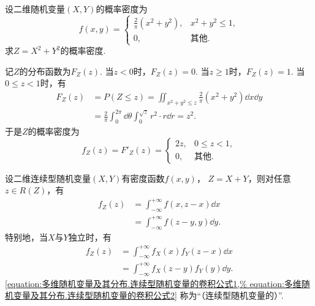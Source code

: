 \begin{example}
设二维随机变量\((X,Y)\)的概率密度为\begin{equation*}
	f(x,y) = \left\{ \begin{array}{cl}
		\frac2\pi (x^2+y^2), & x^2+y^2\leq1, \\
		0, & \text{其他}.
	\end{array} \right.
\end{equation*}
求\(Z = X^2 + Y^2\)的概率密度.
\begin{solution}
记\(Z\)的分布函数为\(F_Z(z)\).
当\(z < 0\)时，\(F_Z(z) = 0\).
当\(z \geq 1\)时，\(F_Z(z) = 1\).
当\(0 \leq z < 1\)时，有\begin{align*}
	F_Z(z) &= P(Z \leq z)
	= \iint_{x^2+y^2 \leq z} \frac2\pi (x^2+y^2) \dd{x}\dd{y} \\
	&= \frac2\pi \int_0^{2\pi} \dd{\theta} \int_0^{\sqrt{z}} r^2 \cdot r \dd{r}
	= z^2.
\end{align*}
于是\(Z\)的概率密度为\begin{equation*}
	f_Z(z) = F'_Z(z) = \left\{ \begin{array}{cl}
		2z, & 0 \leq z < 1, \\
		0, & \text{其他}.
	\end{array} \right.
\end{equation*}
\end{solution}
\end{example}

\begin{theorem}\label{theorem:多维随机变量及其分布.连续型随机变量的卷积公式}
设二维连续型随机变量\((X,Y)\)有密度函数\(f(x,y)\)，
\(Z=X+Y\)，则对任意\(z \in R(Z)\)，有\begin{align}
f_Z(z) &= \int_{-\infty}^{+\infty} f(x,z-x) \dd{x} \\
&= \int_{-\infty}^{+\infty} f(z-y,y) \dd{y}.
\end{align}
特别地，当\(X\)与\(Y\)独立时，有\begin{align}
f_Z(z) &= \int_{-\infty}^{+\infty} f_X(x) f_Y(z-x) \dd{x} \label{equation:多维随机变量及其分布.连续型随机变量的卷积公式1} \\
&= \int_{-\infty}^{+\infty} f_X(z-y) f_Y(y) \dd{y}. \label{equation:多维随机变量及其分布.连续型随机变量的卷积公式2}
\end{align}
\rm\cref{equation:多维随机变量及其分布.连续型随机变量的卷积公式1,%
equation:多维随机变量及其分布.连续型随机变量的卷积公式2}
称为“（连续型随机变量的）”.
\end{theorem}

